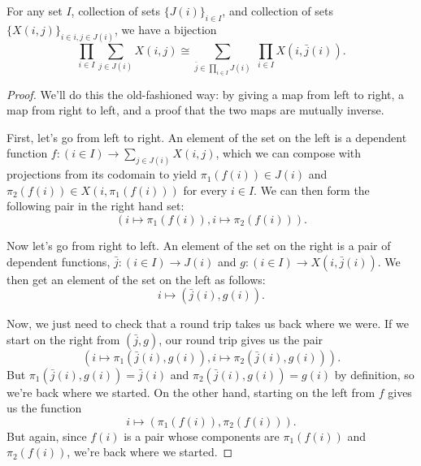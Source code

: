 \documentclass[Book-Poly]{subfiles}
\begin{document}
\begin{proposition}\label{prop.push_prod_sum_set}
For any set $I$, collection of sets $\{J(i)\}_{i\in I}$, and collection of sets $\{X(i,j)\}_{i\in i, j\in J(i)}$, we have a bijection
\begin{equation}\label{eqn.set_completely_distributive}
\prod_{i\in I}\sum_{j\in J(i)}X(i,j)
\cong
\sum_{\bar{j}\in \prod_{i\in I}J(i)}\;\prod_{i\in I}X(i,\bar{j}(i)).
\end{equation}
\end{proposition}
\begin{proof}
We'll do this the old-fashioned way: by giving a map from left to right, a
map from right to left, and a proof that the two maps are mutually inverse. 

First, let's go from left to right. An element of the set on the left is a dependent function $f \colon (i \in I) \to \sum_{j \in J(i)} X(i, j)$, which we can compose with projections from its codomain to yield $\pi_1(f(i)) \in J(i)$ and $\pi_2(f(i)) \in X(i, \pi_1(f(i)))$ for every $i \in I$.
We can then form the following pair in the right hand set:
\[
    (i \mapsto \pi_1(f(i)), i \mapsto \pi_2(f(i))).
\]

Now let's go from right to left. An element of the set on the right is a pair of dependent functions, $\bar{j} \colon (i \in I) \to J(i)$ and $g \colon
(i \in I) \to X(i, \bar{j}(i))$. We then get an element of the set on the left as follows:
\[i \mapsto (\bar{j}(i), g(i)).\]

Now, we just need to check that a round trip takes us back where we were. If we
start on the right from $(\bar{j}, g)$, our round trip gives us the pair
\[(i \mapsto \pi_1(\bar{j}(i), g(i)), i \mapsto \pi_2(\bar{j}(i), g(i))).\]
But $\pi_1(\bar{j}(i), g(i)) = \bar{j}(i)$ and $\pi_2(\bar{j}(i), g(i)) = g(i)$ by definition, so
we're back where we started. On the other hand, starting on the left from $f$ gives us the function
\[i \mapsto (\pi_1(f(i)), \pi_2(f(i))).\]
But again, since $f(i)$ is a pair whose components are $\pi_1(f(i))$ and $\pi_2(f(i))$, we're back where we started.

\end{proof}
\end{document}
